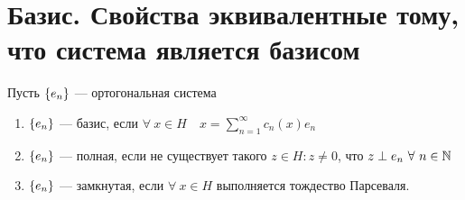 \section{Базис. Свойства эквивалентные тому, что система является базисом}

\begin{definition}
    Пусть $\set{e_n}$ --- ортогональная система
    \begin{enumerate}
        \item $\set{e_n}$ --- базис, если $\forall\ x \in H\quad x = \sum\limits_{n=1}^\infty c_n(x) e_n$
        \item $\set{e_n}$ --- полная, если не существует такого $z \in H: z \neq 0$, что $z \perp e_n\ \forall\ n \in \mathbb{N}$
        \item $\set{e_n}$ --- замкнутая, если $\forall\ x \in H$ выполняется тождество Парсеваля.
    \end{enumerate}
\end{definition}

